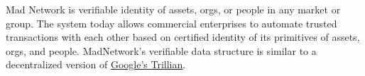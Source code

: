 Mad Network is verifiable identity of assets, orgs, or people in any market
or group. The system today allows commercial enterprises to automate
trusted transactions with each other based on certified identity of its
primitives of assets, orgs, and people.
MadNetwork's verifiable data structure is similar to a decentralized
version of
\href{https://github.com/google/trillian/blob/master/docs/papers/VerifiableDataStructures.pdf}{Google's Trillian}.
